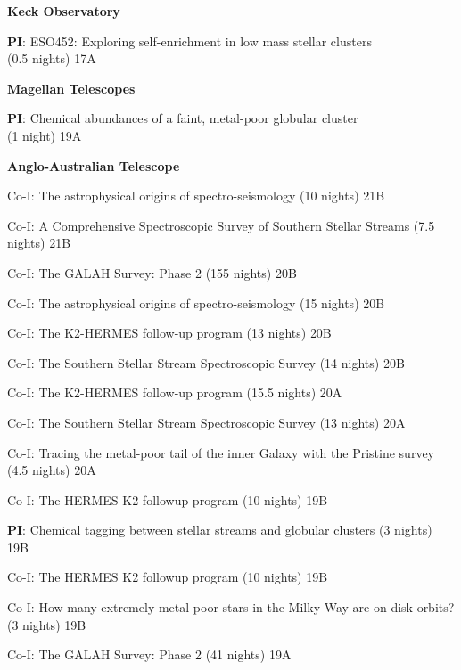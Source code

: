 \documentclass[10pt]{article}
\begin{document}
\textbf{Keck Observatory}
\begin{innerlist}
\item \textbf{PI}: ESO452: Exploring self-enrichment in low mass stellar clusters\\ (0.5 nights)  \hfill{17A}
\end{innerlist}

\vspace{0.1in}
\textbf{Magellan Telescopes}
\begin{innerlist}
\item \textbf{PI}: Chemical abundances of a faint, metal-poor globular cluster\\ (1 night)  \hfill{19A}

\vspace{0.1in}
\textbf{Anglo-Australian Telescope}
\begin{innerlist}
\item Co-I: The astrophysical origins of spectro-seismology (10 nights) \hfill{21B}
\item Co-I: A Comprehensive Spectroscopic Survey of Southern Stellar Streams (7.5 nights) \hfill{21B}
\item Co-I: The GALAH Survey: Phase 2 (155 nights) \hfill{20B}
\item Co-I: The astrophysical origins of spectro-seismology (15 nights) \hfill{20B}
\item Co-I: The K2-HERMES follow-up program (13 nights) \hfill{20B}
\item Co-I: The Southern Stellar Stream Spectroscopic Survey (14 nights) \hfill{20B}
\item Co-I: The K2-HERMES follow-up program (15.5 nights) \hfill{20A}
\item Co-I: The Southern Stellar Stream Spectroscopic Survey (13 nights) \hfill{20A}
\item Co-I: Tracing the metal-poor tail of the inner Galaxy with the Pristine survey (4.5 nights) \hfill{20A}
\item Co-I: The HERMES K2 followup program (10 nights) \hfill{19B}
\item \textbf{PI}: Chemical tagging between stellar streams and globular clusters (3 nights) \hfill{19B}
\item Co-I: The HERMES K2 followup program (10 nights) \hfill{19B}
\item Co-I: How many extremely metal-poor stars in the Milky Way are on disk orbits? (3 nights) \hfill{19B}
\item Co-I: The GALAH Survey: Phase 2 (41 nights) \hfill{19A}

\end{innerlist}
\end{innerlist}
\end{document}
